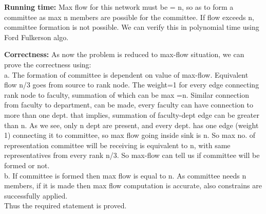 \documentclass[11pt]{article}
\newcommand\correctness{\vspace{.10in}\textbf{Correctness: }}
\newcommand\runtime{\vspace{.10in}\textbf{Running time: }}
\begin{document}
\runtime Max flow for this network must be = n, so as to form a committee as max n members are possible for the committee. If flow exceeds n, committee formation is not possible. We can verify this in polynomial time using Ford Fulkerson algo.

\correctness
As now the problem is reduced to max-flow situation, we can prove the correctness using:\\
a. The formation of committee is dependent on value of max-flow. Equivalent flow n/3 goes from source to rank node. The weight=1 for every edge connecting rank node to faculty, summation of which can be max =n. Similar connection from faculty to department, can be made, every faculty can have connection to more than one dept. that implies, summation of faculty-dept edge can be greater than n. As we see, only n dept are present, and every dept. has one edge (weight 1) connecting it to committee, so max flow going inside sink is n. So max no. of representation committee will be receiving is equivalent to n, with same representatives from every rank n/3. So max-flow can tell us if committee will be formed or not.\\
b. If committee is formed then max flow is equal to n. As committee needs n members, if it is made then max flow computation is accurate, also constrains are successfully applied.\\  
Thus the required statement is proved.\\
\end{document}
